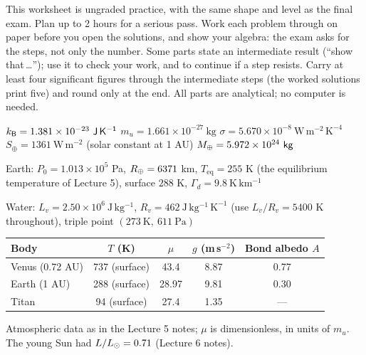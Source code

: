 
\ipsmaketitle

This worksheet is ungraded practice, with the same shape and level as the final exam.
Plan up to 2 hours for a serious pass.
Work each problem through on paper before you open the solutions, and show your algebra:
the exam asks for the steps, not only the number.
Some parts state an intermediate result (``show that\,\ldots''); use it to check your work, and to continue if a step resists.
Carry at least four significant figures through the intermediate steps (the worked solutions print five) and round only at the end.
All parts are analytical; no computer is needed.

\begin{given}
$\kB = 1.381 \times 10^{-23}\ \mathrm{J\,K^{-1}}$ \quad
$m_u = 1.661 \times 10^{-27}\ \mathrm{kg}$ \quad
$\sigma = 5.670 \times 10^{-8}\ \mathrm{W\,m^{-2}\,K^{-4}}$ \quad
$S_\oplus = 1361\ \mathrm{W\,m^{-2}}$ (solar constant at 1 AU) \quad
$M_{\oplus} = 5.972 \times 10^{24}\ \mathsf{kg}$

\vskip4pt
Earth: $P_0 = 1.013 \times 10^{5}$ Pa, $R_{\oplus} = 6371$ km, $T_{\mathrm{eq}} = 255$ K (the equilibrium temperature of Lecture 5), surface $288$ K, $\Gamma_d = 9.8\ \mathrm{K\,km^{-1}}$

\vskip4pt
Water: $L_v = 2.50 \times 10^{6}\ \mathrm{J\,kg^{-1}}$, $R_v = 462\ \mathrm{J\,kg^{-1}\,K^{-1}}$ (use $L_v/R_v = 5400$ K throughout), triple point $(273\ \mathrm{K},\ 611\ \mathrm{Pa})$

\vskip6pt
\begin{tabular}{@{}lcccc@{}}
\toprule
Body & $T$ (K) & $\mu$ & $g$ (m\,s$^{-2}$) & Bond albedo $A$ \\
\midrule
Venus (0.72 AU) & 737 (surface) & 43.4 & 8.87 & 0.77 \\
Earth (1 AU)    & 288 (surface) & 28.97 & 9.81 & 0.30 \\
Titan           & 94 (surface)  & 27.4 & 1.35 & --- \\
\bottomrule
\end{tabular}

\vskip4pt
{\footnotesize Atmospheric data as in the Lecture 5 notes; $\mu$ is dimensionless, in units of $m_u$. The young Sun had $L/L_{\odot} = 0.71$ (Lecture 6 notes).}
\end{given}

